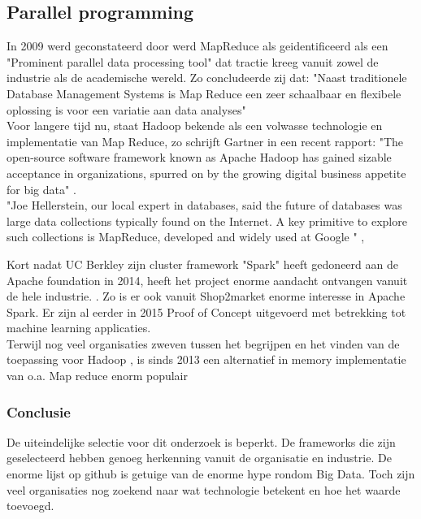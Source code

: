 \clearpage

\subsection{Parallel programming}

In 2009 werd geconstateerd door \cite{aarnio2009parallel} werd MapReduce als geidentificeerd als een "Prominent parallel data processing tool" dat tractie kreeg vanuit zowel de industrie als de academische wereld. Zo concludeerde zij dat: "Naast traditionele Database Management Systems is Map Reduce een zeer schaalbaar en flexibele oplossing is voor een variatie aan data analyses" \parencite{aarnio2009parallel} \\

Voor langere tijd nu, staat Hadoop bekende als een volwasse technologie en implementatie van Map Reduce, zo schrijft Gartner in een recent rapport: "The open-source software framework known as Apache Hadoop has gained sizable acceptance in organizations, spurred on by the growing digital business appetite for big data" \parencite{hadoop2013selection}. \\


"Joe Hellerstein, our local expert in databases, said the future of databases was large data
collections typically found on the Internet. A key primitive to explore such collections is
MapReduce, developed and widely used at Google \parencite{dean2008mapreduce}" \parencite{asanovic2006landscape}, 

Kort nadat UC Berkley zijn cluster framework "Spark" heeft gedoneerd aan de Apache foundation in 2014, heeft het project enorme aandacht ontvangen vanuit de hele industrie. \parencite{spark2015intro}. Zo is er ook vanuit Shop2market enorme interesse in Apache Spark. Er zijn al eerder in 2015 Proof of Concept uitgevoerd met betrekking tot machine learning applicaties. \\

Terwijl nog veel organisaties zweven tussen het begrijpen en het vinden van de toepassing voor Hadoop \parencite{hadoop2015adoption}, is sinds 2013 een alternatief in memory implementatie van o.a. Map reduce enorm populair  \parencite{spark2015intro}

\subsubsection{Conclusie}

De uiteindelijke selectie voor dit onderzoek is beperkt. De frameworks die zijn geselecteerd hebben genoeg herkenning vanuit de organisatie en industrie. De enorme lijst op github is getuige van de enorme hype rondom Big Data. Toch zijn veel organisaties nog zoekend naar wat technologie betekent en hoe het waarde toevoegd\parencite{hadoop2015adoption}.

